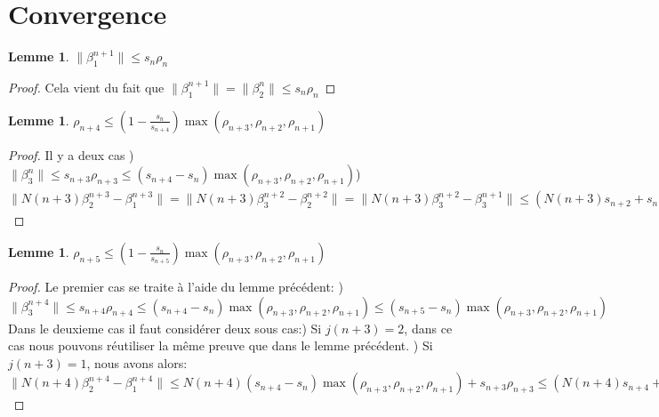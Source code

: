 \documentclass[12pt]{article}
\theoremstyle{plain}%
\newtheorem{lem}[thm]{Lemme}
\theoremstyle{definition}
\theoremstyle{remark}
\begin{document}
\section{Convergence}
\begin{lem}
$\|\beta_1^{n+1}\| \leq s_n \rho_n$
\end{lem}
\begin{proof}
Cela vient du fait que $\|\beta_1^{n+1}\|=\| \beta_2^n\| \leq s_n \rho_n$
\end{proof}
\begin{lem}
$\rho_{n+4} \leq (1-\frac{s_n}{s_{n+4}})\max{(\rho_{n+3},\rho_{n+2},\rho_{n+1})}$
\end{lem}
\begin{proof}
Il y a deux cas ) $\| \beta_3^{n} \| \leq s_{n+3} \rho_{n+3} \leq (s_{n+4}-s_n) \max{(\rho_{n+3},\rho_{n+2},\rho_{n+1})} $) $\|N(n+3) \beta_2^{n+3} - \beta_1^{n+3} \| = \|N(n+3) \beta_3^{n+2} - \beta_2^{n+2} \| =\|N(n+3) \beta_3^{n+2} - \beta_3^{n+1} \| \leq (N(n+3)s_{n+2}+s_{n+1})\max{(\rho_{n+3},\rho_{n+2},\rho_{n+1})} \leq (N(n+3)N(n+2)s_{n+2}+N(n+3)s_n+s_{n+1}+s_n)\max{(\rho_{n+3},\rho_{n+2},\rho_{n+1})} \leq (N(n+3)s_n{n+3}+s_{n+1}-s_n)\max{(\rho_{n+3},\rho_{n+2},\rho_{n+1})} \leq (s_{n+4}-s_n)\max{(\rho_{n+3},\rho_{n+2},\rho_{n+1})}$
\end{proof}
\begin{lem}
$\rho_{n+5} \leq (1-\frac{s_n}{s_{n+5}})\max{(\rho_{n+3},\rho_{n+2},\rho_{n+1})}$
\end{lem}
\begin{proof}
Le premier cas se traite à l'aide du lemme précédent: ) $\| \beta_3^{n+4} \| \leq s_{n+4} \rho_{n+4} \leq (s_{n+4}-s_n)\max{(\rho_{n+3},\rho_{n+2},\rho_{n+1})} \leq (s_{n+5}-s_n)\max{(\rho_{n+3},\rho_{n+2},\rho_{n+1})}$ \newline
Dans le deuxieme cas il faut considérer deux sous cas:) Si $j(n+3)=2$, dans ce cas nous pouvons réutiliser la même preuve que dans le lemme précédent. ) Si $j(n+3)=1$, nous avons alors:\newline
$\|N(n+4) \beta_2^{n+4}-\beta_1^{n+4}\| \leq N(n+4)(s_{n+4}-s_n)\max{(\rho_{n+3},\rho_{n+2},\rho_{n+1})} + s_{n+3} \rho_{n+3} \leq (N(n+4)s_{n+4}+s_{n+3}-s_n)\max{(\rho_{n+3},\rho_{n+2},\rho_{n+1})}=(s_{n+5}-s_n)\max{(\rho_{n+3},\rho_{n+2},\rho_{n+1})}$
\end{proof}
\end{document}
